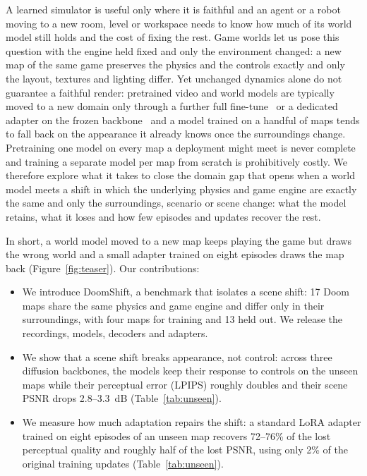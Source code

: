 \documentclass{article}
\begin{document}
A learned simulator is useful only where it is faithful and an agent or a robot moving to a new room, level or workspace needs to know how much of its world model still holds and the cost of fixing the rest.
Game worlds let us pose this question with the engine held fixed and only the environment changed: a new map of the same game preserves the physics and the controls exactly and only the layout, textures and lighting differ.
Yet unchanged dynamics alone do not guarantee a faithful render: pretrained video and world models are typically moved to a new domain only through a further full fine-tune~\citep{gao2025adaworld} or a dedicated adapter on the frozen backbone~\citep{rigter2024avid} and a model trained on a handful of maps tends to fall back on the appearance it already knows once the surroundings change.
Pretraining one model on every map a deployment might meet is never complete and training a separate model per map from scratch is prohibitively costly. We therefore explore what it takes to close the domain gap that opens when a world model meets a shift in which the underlying physics and game engine are exactly the same and only the surroundings, scenario or scene change: what the model retains, what it loses and how few episodes and updates recover the rest.

In short, a world model moved to a new map keeps playing the game but draws the wrong world and a small adapter trained on eight episodes draws the map back (Figure~\ref{fig:teaser}). Our contributions:
\begin{itemize}\setlength{\itemsep}{0pt}
\item We introduce DoomShift, a benchmark that isolates a scene shift: 17 Doom maps share the same physics and game engine and differ only in their surroundings, with four maps for training and 13 held out. We release the recordings, models, decoders and adapters.
\item We show that a scene shift breaks appearance, not control: across three diffusion backbones, the models keep their response to controls on the unseen maps while their perceptual error (LPIPS) roughly doubles and their scene PSNR drops 2.8--3.3~dB (Table~\ref{tab:unseen}).
\item We measure how much adaptation repairs the shift: a standard LoRA adapter trained on eight episodes of an unseen map recovers 72--76\% of the lost perceptual quality and roughly half of the lost PSNR, using only 2\% of the original training updates (Table~\ref{tab:unseen}).
\end{itemize}
\end{document}
